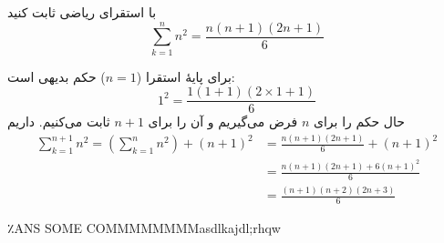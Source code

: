 با استقرای ریاضی ثابت کنید
$$
\sum_{k=1}^{n}n^2=\frac{n(n+1)(2n+1)}{6}
$$
\begin{ans}
  برای پایهٔ استقرا ($n=1$) حکم بدیهی است:
  $$
  1^2 = \frac{1(1+1)(2\times 1+1)}{6}
  $$
  حال حکم را برای $n$ فرض می‌گیریم و آن را برای $n+1$ ثابت می‌کنیم. داریم
  \begin{align*}
  \sum_{k=1}^{n+1}n^2=(\sum_{k=1}^{n}n^2)+(n+1)^2&=\frac{n(n+1)(2n+1)}{6}+(n+1)^2\\
  &=\frac{n(n+1)(2n+1)+6(n+1)^2}{6}\\
  &=\frac{(n+1)(n+2)(2n+3)}{6}
  \end{align*}
\end{ans}
٪ANS SOME COMMMMMMMMasdlkajdl;rhqw
